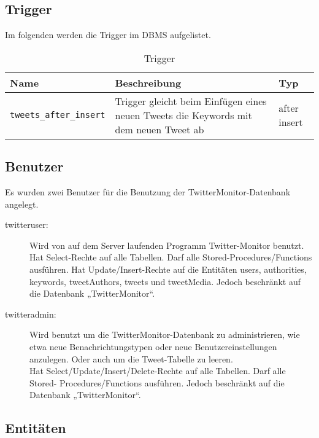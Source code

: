 \subsection{Trigger}

Im folgenden werden die Trigger im DBMS aufgelistet.
\begin{table}[!ht]
\caption{Trigger}
  \begin{tabular}{p{3.6cm}p{7.6cm}p{2.6cm}}
    \toprule 
    \textbf{Name}  & \textbf{Beschreibung} & \textbf{Typ} \\
    \hline 
    \texttt{tweets\_after\_insert} & Trigger gleicht beim Einfügen eines neuen Tweets die Keywords mit dem neuen Tweet ab & after insert  \\
	\bottomrule
  \end{tabular}
\end{table}

\subsection{Benutzer}

Es wurden zwei Benutzer für die Benutzung der TwitterMonitor-Datenbank angelegt.  
\begin{description}
	\item [twitteruser: ] Wird von auf dem Server laufenden Programm Twitter-Monitor benutzt. Hat Select-Rechte auf alle Tabellen. Darf alle Stored-Procedures/Functions ausführen. Hat Update/Insert-Rechte auf die Entitäten users, authorities, keywords, tweetAuthors, tweets und tweetMedia. Jedoch beschränkt auf die Datenbank „TwitterMonitor“. 
	\item [twitteradmin: ] Wird benutzt um die TwitterMonitor-Datenbank zu administrieren, wie etwa neue Benachrichtungstypen oder neue Benutzereinstellungen anzulegen. Oder auch um die 
		Tweet-Tabelle zu leeren. \\
		Hat Select/Update/Insert/Delete-Rechte auf alle Tabellen. Darf alle Stored-
		Procedures/Functions ausführen. Jedoch beschränkt auf die Datenbank
		„TwitterMonitor“. 
\end{description}
 
\subsection{Entitäten}
 
